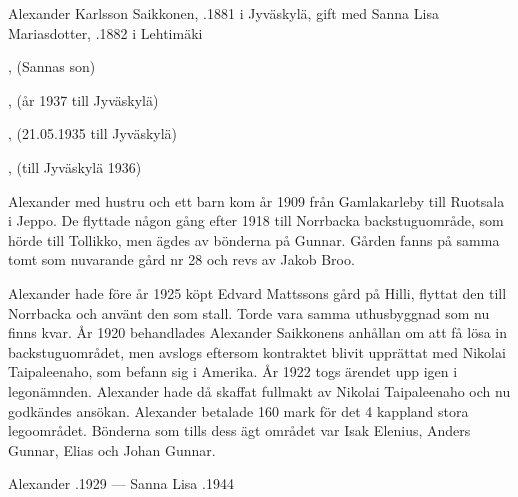 

Alexander Karlsson Saikkonen, .1881 i Jyväskylä, gift med Sanna Lisa Mariasdotter, .1882 i Lehtimäki
\begin{jhchildren}
  \item {}, (Sannas son)
  \item {}
  \item {}, (år 1937 till Jyväskylä)
  \item {}
  \item {}
  \item {}, (21.05.1935 till Jyväskylä)
  \item {}, (till Jyväskylä 1936)
\end{jhchildren}

Alexander med hustru och ett barn kom år 1909 från Gamlakarleby till Ruotsala i Jeppo. De flyttade någon gång efter 1918 till Norrbacka backstuguområde, som hörde till Tollikko, men ägdes av bönderna på Gunnar. Gården fanns på samma tomt som nuvarande gård nr 28 och revs av Jakob Broo.

Alexander hade före år 1925 köpt Edvard Mattssons gård på Hilli, flyttat den till Norrbacka och använt den som stall. Torde vara samma uthusbyggnad som nu finns kvar. År 1920 behandlades Alexander Saikkonens anhållan om att få lösa in backstuguområdet, men avslogs eftersom kontraktet blivit upprättat med Nikolai Taipaleenaho, som befann sig i Amerika. År 1922 togs ärendet upp igen i legonämnden. Alexander hade då skaffat fullmakt av Nikolai Taipaleenaho och nu godkändes ansökan. Alexander betalade 160 mark för det 4 kappland stora legoområdet. Bönderna som tills dess ägt området var Isak Elenius, Anders Gunnar, Elias och Johan Gunnar.

Alexander .1929  ---  Sanna Lisa .1944



